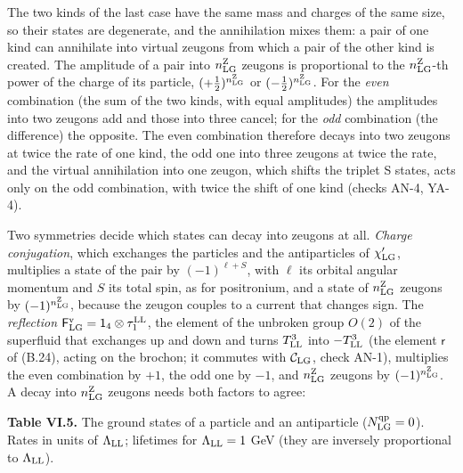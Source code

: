 \documentclass[
  10pt,
]{article}
\begin{document}
The two kinds of the last case have the same mass and charges of the
same size, so their states are degenerate, and the annihilation mixes
them: a pair of one kind can annihilate into virtual zeugons from which
a pair of the other kind is created. The amplitude of a pair into
\(n^{\rm Z}_{\rm LG}\) zeugons is proportional to the
\(n^{\rm Z}_{\rm LG}\)-th power of the charge of its particle,
\((+\tfrac12)^{n^{\rm Z}_{\rm LG}}\) or
\((-\tfrac12)^{n^{\rm Z}_{\rm LG}}\). For the \emph{even} combination
(the sum of the two kinds, with equal amplitudes) the amplitudes into
two zeugons add and those into three cancel; for the \emph{odd}
combination (the difference) the opposite. The even combination
therefore decays into two zeugons at twice the rate of one kind, the odd
one into three zeugons at twice the rate, and the virtual annihilation
into one zeugon, which shifts the triplet S states, acts only on the odd
combination, with twice the shift of one kind (checks AN-4, YA-4).

Two symmetries decide which states can decay into zeugons at all.
\emph{Charge conjugation}, which exchanges the particles and the
antiparticles of \(\chi'_{\rm LG}\), multiplies a state of the pair by
\((-1)^{\ell+S}\), with \(\ell\) its orbital angular momentum and \(S\)
its total spin, as for positronium, and a state of
\(n^{\rm Z}_{\rm LG}\) zeugons by \((-1)^{n^{\rm Z}_{\rm LG}}\), because
the zeugon couples to a current that changes sign. The \emph{reflection}
\(\mathsf F^{\rm v}_{\rm LG}=\mathsf1_4\otimes\tau^{\rm LL}_1\), the
element of the unbroken group \(O(2)\) of the superfluid that exchanges
up and down and turns \(T^3_{\rm LL}\) into \(-T^3_{\rm LL}\) (the
element \(\mathsf r\) of (B.24), acting on the brochon; it commutes with
\(\mathcal C_{\rm LG}\), check AN-1), multiplies the even combination by
\(+1\), the odd one by \(-1\), and \(n^{\rm Z}_{\rm LG}\) zeugons by
\((-1)^{n^{\rm Z}_{\rm LG}}\). A decay into \(n^{\rm Z}_{\rm LG}\)
zeugons needs both factors to agree:

\textbf{Table VI.5.} The ground states of a particle and an antiparticle
(\(N^{\rm qp}_{\rm LG}=0\)). Rates in units of \(\Lambda_{\rm LL}\);
lifetimes for \(\Lambda_{\rm LL}=1\) GeV (they are inversely
proportional to \(\Lambda_{\rm LL}\)).
\end{document}
